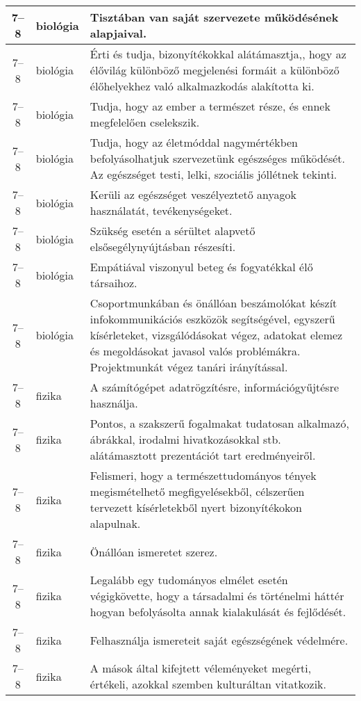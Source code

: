 \begin{small}
\begin{longtable}{c | p{2cm} |  p{11cm} }
              7--8 & biológia & Tisztában van saját szervezete működésének alapjaival. \\ \hline
              7--8 & biológia & Érti és tudja, bizonyítékokkal alátámasztja,, hogy az élővilág különböző megjelenési formáit a különböző élőhelyekhez való alkalmazkodás alakította ki. \\ \hline
              7--8 & biológia & Tudja, hogy az ember a természet része, és ennek megfelelően cselekszik. \\ \hline
              7--8 & biológia & Tudja, hogy az életmóddal nagymértékben befolyásolhatjuk szervezetünk egészséges működését. Az egészséget testi, lelki, szociális jóllétnek tekinti. \\ \hline
              7--8 & biológia & Kerüli az egészséget veszélyeztető anyagok használatát, tevékenységeket. \\ \hline
              7--8 & biológia & Szükség esetén a sérültet alapvető elsősegélynyújtásban részesíti. \\ \hline
              7--8 & biológia & Empátiával viszonyul beteg és fogyatékkal élő társaihoz. \\ \hline
              7--8 & biológia & Csoportmunkában és önállóan beszámolókat készít infokommunikációs eszközök segítségével, egyszerű kísérleteket, vizsgálódásokat végez, adatokat elemez és megoldásokat javasol valós problémákra. Projektmunkát végez tanári irányítással. \\ \hline
              7--8 & fizika & A számítógépet adatrögzítésre, információgyűjtésre használja. \\ \hline
              7--8 & fizika & Pontos, a szakszerű fogalmakat tudatosan alkalmazó, ábrákkal, irodalmi hivatkozásokkal stb. alátámasztott prezentációt tart eredményeiről. \\ \hline
              7--8 & fizika & Felismeri, hogy a természettudományos tények megismételhető megfigyelésekből, célszerűen tervezett kísérletekből nyert bizonyítékokon alapulnak. \\ \hline
              7--8 & fizika & Önállóan ismeretet szerez. \\ \hline
              7--8 & fizika & Legalább egy tudományos elmélet esetén végigkövette, hogy a társadalmi és történelmi háttér hogyan befolyásolta annak kialakulását és fejlődését. \\ \hline
              7--8 & fizika & Felhasználja ismereteit saját egészségének védelmére. \\ \hline
              7--8 & fizika & A mások által kifejtett véleményeket megérti, értékeli, azokkal szemben kulturáltan vitatkozik. \\ \hline

\end{longtable}
\end{small}
